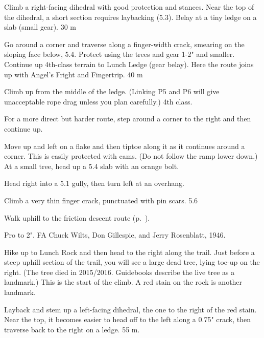 \documentclass{tahquitz}
\begin{document}
 Climb a right-facing dihedral with good protection and
stances. Near the top of the dihedral, a short section requires laybacking (5.3).
Belay at a tiny ledge on a slab (small gear). 30 m

 Go around a corner and traverse along a finger-width crack,
smearing on the sloping face below, 5.4. Protect using the trees and
gear 1-2" and smaller. Continue up 4th-class terrain to Lunch Ledge (gear
belay). Here the route joins up with Angel's Fright and Fingertrip. 40 m


 Climb up from the middle of the ledge. (Linking P5 and P6 will
give unacceptable rope drag unless you plan carefully.) 4th class.

 For a more direct but harder route, step around a corner
to the right and then continue up.

 Move up and left on a flake
and then tiptoe along it as it continues around a corner.
This is easily protected with cams. (Do not follow the ramp lower down.) At a small
tree, head up a 5.4 slab with an orange bolt.

 Head right into a 5.1 gully, then turn left at an overhang.

 Climb a very thin finger crack, punctuated with pin scars. 5.6

Walk uphill to the friction descent route  (p.~\pageref{subsec:friction-descent}).




Pro to 2".
FA Chuck Wilts, Don Gillespie, and Jerry Rosenblatt, 1946.

Hike up to Lunch Rock and then head to the right along the
trail. Just before a steep uphill section of the trail, you
will see a large dead tree, lying toe-up on the right. (The tree died in 2015/2016.
Guidebooks describe the live tree as a landmark.) This
is the start of the climb. A red stain on the rock is another
landmark. 

 Layback and stem up a left-facing dihedral, the one
to the right of the red stain. Near the top, it becomes easier to
head off to the left along a 0.75" crack, then traverse back to the right
on a ledge. 55 m.
\end{document}
